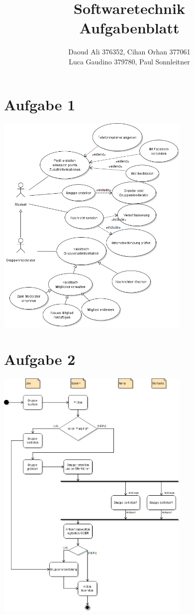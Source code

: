 \documentclass[a4paper,12pt]{article}
\author {Daoud Ali 376352, Cihan Orhan 377061\\ Luca Gaudino 379780, Paul Sonnleitner}
\date {}
\title	{\textbf{Softwaretechnik}\\
		Aufgabenblatt \RM{2}
		}
\newcommand{\aufgabe}[1]{\section*{Aufgabe #1}}
\begin{document}
\doublespacing
\maketitle
\onehalfspacing

\aufgabe{1}
\includegraphics[width=0.7\textwidth]{UseCaseUML_1.png}


\aufgabe{2}
\includegraphics[width=0.7\textwidth]{ActivityUML_1.png}
\end{document}
